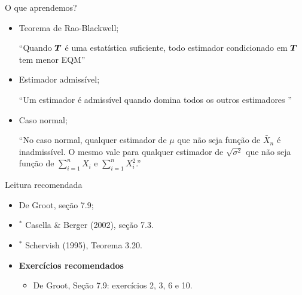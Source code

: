 \begin{frame}{O que aprendemos?}
\begin{itemize}

  \item[\faLightbulbO] Teorema de Rao-Blackwell;    
  
    ``Quando $\boldsymbol{T}$ é uma estatística suficiente, todo estimador condicionado em $\boldsymbol{T}$ tem menor EQM''
    
 \item[\faLightbulbO] Estimador admissível;
 
  ``Um estimador é admissível quando domina todos os outros estimadores ''

 \item[\faLightbulbO] Caso normal;
 
  ``No caso normal, qualquer estimador de $\mu$ que não seja função de $\bar{X}_n$ é inadmissível.
  O mesmo vale para qualquer estimador de $\sqrt{\sigma^2}$ que não seja função de $\sum_{i=1}^n X_i$ e $\sum_{i=1}^n X_i^2$.''
 
 
  \end{itemize}
 \end{frame}

\begin{frame}{Leitura recomendada}
\begin{itemize}
 \item[\faBook] De Groot, seção 7.9;
 \item[\faBook] $^\ast$ Casella \& Berger (2002), seção 7.3.
 \item[\faBook] $^\ast$ Schervish (1995),  Teorema 3.20.
 \item {\large\textbf{Exercícios recomendados}}
 \begin{itemize}
  \item[\faBookmark] De Groot, Seção 7.9: exercícios 2, 3, 6 e 10.
  \end{itemize}
 \end{itemize} 
\end{frame}
